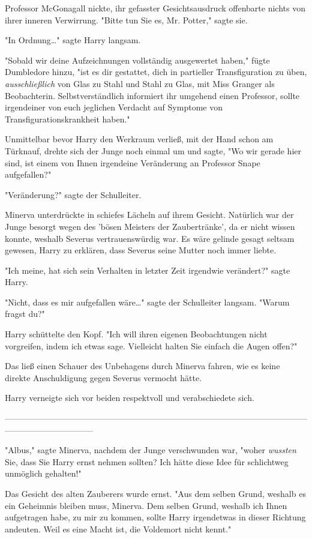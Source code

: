 {Professor McGonagall nickte, ihr gefasster Gesichtsausdruck offenbarte nichts von ihrer inneren Verwirrung. "Bitte tun Sie es, Mr. Potter," sagte sie.

"In Ordnung…" sagte Harry langsam.

"Sobald wir deine Aufzeichnungen vollständig ausgewertet haben," fügte Dumbledore hinzu, "ist es dir gestattet, dich in partieller Transfiguration zu üben, \emph{ausschließlich} von Glas zu Stahl und Stahl zu Glas, mit Miss Granger als Beobachterin. Selbstverständlich informiert ihr umgehend einen Professor, sollte irgendeiner von euch jeglichen Verdacht auf Symptome von Transfigurationskrankheit haben."

Unmittelbar bevor Harry den Werkraum verließ, mit der Hand schon am Türknauf, drehte sich der Junge noch einmal um und sagte, "Wo wir gerade hier sind, ist einem von Ihnen irgendeine Veränderung an Professor Snape aufgefallen?"

"Veränderung?" sagte der Schulleiter.

Minerva unterdrückte in schiefes Lächeln auf ihrem Gesicht. Natürlich war der Junge besorgt wegen des 'bösen Meisters der Zaubertränke', da er nicht wissen konnte, weshalb Severus vertrauenswürdig war. Es wäre gelinde gesagt seltsam gewesen, Harry zu erklären, dass Severus seine Mutter noch immer liebte.

"Ich meine, hat sich sein Verhalten in letzter Zeit irgendwie verändert?" sagte Harry.

"Nicht, dass es mir aufgefallen wäre…" sagte der Schulleiter langsam. "Warum fragst du?"

Harry schüttelte den Kopf. "Ich will ihren eigenen Beobachtungen nicht vorgreifen, indem ich etwas sage. Vielleicht halten Sie einfach die Augen offen?"

Das ließ einen Schauer des Unbehagens durch Minerva fahren, wie es keine direkte Anschuldigung gegen Severus vermocht hätte.

Harry verneigte sich vor beiden respektvoll und verabschiedete sich.

--------------------------------------------------------------------------------------------------------------------------------------------

"Albus," sagte Minerva, nachdem der Junge verschwunden war, "woher \emph{wussten} Sie, dass Sie Harry ernst nehmen sollten? Ich hätte diese Idee für schlichtweg unmöglich gehalten!"

Das Gesicht des alten Zauberers wurde ernst. "Aus dem selben Grund, weshalb es ein Geheimnis bleiben muss, Minerva. Dem selben Grund, weshalb ich Ihnen aufgetragen habe, zu mir zu kommen, sollte Harry irgendetwas in dieser Richtung andeuten. Weil es eine Macht ist, die Voldemort nicht kennt."

}
